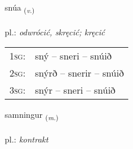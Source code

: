 \documentclass[frontgrid, backgrid]{flacards}\usepackage[]{graphicx}\usepackage[]{xcolor}
\begin{document}
\renewcommand{\flhead}{\vskip5pt \fboxsep=0pt {\small\bfseries\footnotesize Sagnorð | czasownik}}
\renewcommand{\fcfoot}{\vskip5pt \fboxsep=0pt \hspace{2pt}{\small\bfseries\footnotesize 1K}}

\renewcommand{\blhead}{\vskip5pt {\small\bfseries\footnotesize Sagnorð | czasownik }}
\renewcommand{\bcfoot}{\vskip5pt \hspace{2pt}{\small\bfseries\footnotesize 1K}}


{snúa \small{\textsubscript{(\textit{v.})}} \\[1ex] %
\textphonetic{[stnuːa]} \\
pl.: \emph{odwrócić, skręcić; kręcić} \\  [2ex]
\renewcommand*{\arraystretch}{0.8}
\begin{tabular}{p{1cm}l}
\textsc{1sg}: & sný -- sneri -- snúið \\ 
\textsc{2sg}: & snýrð -- snerir -- snúið \\ 
\textsc{3sg}: & snýr -- sneri -- snúið \\ 
\end{tabular}
}

\renewcommand{\flhead}{\vskip5pt \fboxsep=0pt {\small\bfseries\footnotesize Nafnorð | rzeczownik}}
\renewcommand{\fcfoot}{\vskip5pt \fboxsep=0pt \hspace{2pt}{\small\bfseries\footnotesize 1K}}

\renewcommand{\blhead}{\vskip5pt {\small\bfseries\footnotesize Nafnorð | rzeczownik }}
\renewcommand{\bcfoot}{\vskip5pt \hspace{2pt}{\small\bfseries\footnotesize 1K}}


{samningur \small{\textsubscript{(\textit{m.})}} \\[1ex] %
\textphonetic{[samniŋkʏr]} \\
pl.: \emph{kontrakt} \\  [2ex]
\renewcommand*{\arraystretch}{0.8}
}
\end{document}
